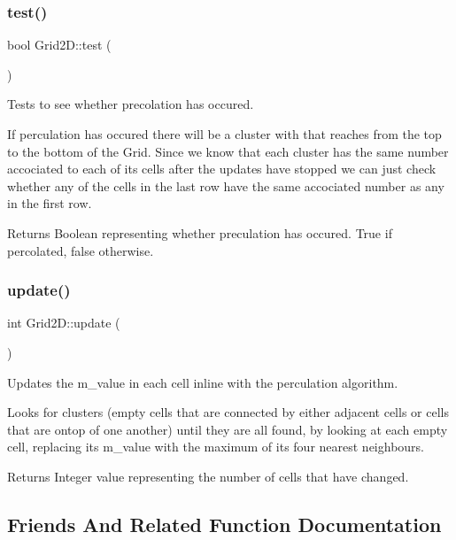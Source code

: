 \subsubsection{\texorpdfstring{test()}{test()}}
{\footnotesize\ttfamily bool Grid2\+D\+::test (\begin{DoxyParamCaption}{ }\end{DoxyParamCaption})}



Tests to see whether precolation has occured. 

If perculation has occured there will be a cluster with that reaches from the top to the bottom of the Grid. Since we know that each cluster has the same number accociated to each of its cells after the updates have stopped we can just check whether any of the cells in the last row have the same accociated number as any in the first row.

\begin{DoxyReturn}{Returns}
Boolean representing whether preculation has occured. True if percolated, false otherwise. 
\end{DoxyReturn}
\mbox{\label{class_grid2_d_a93716d994875e2a03ad51fb20a113687}} 
\subsubsection{\texorpdfstring{update()}{update()}}
{\footnotesize\ttfamily int Grid2\+D\+::update (\begin{DoxyParamCaption}{ }\end{DoxyParamCaption})}



Updates the m\+\_\+value in each cell inline with the perculation algorithm. 

Looks for clusters (empty cells that are connected by either adjacent cells or cells that are ontop of one another) until they are all found, by looking at each empty cell, replacing its m\+\_\+value with the maximum of its four nearest neighbours.

\begin{DoxyReturn}{Returns}
Integer value representing the number of cells that have changed. 
\end{DoxyReturn}


\subsection{Friends And Related Function Documentation}
\mbox{\label{class_grid2_d_a86aad296a546a8469ae64cfe33a5a370}} 
